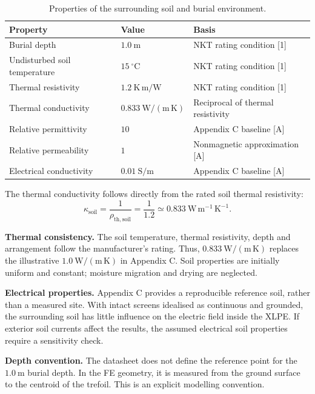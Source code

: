 \documentclass[11pt,a4paper]{article}
\newcommand{\subhead}[1]{\par\medskip{\large\bfseries #1}\par\smallskip}
\begin{document}
\begin{table}[H]
\centering
\caption{Properties of the surrounding soil and burial environment.}
\label{tab:soil}
\begin{tabularx}{\linewidth}{@{}Y l Y@{}}
\toprule
Property & Value & Basis\\
\midrule
Burial depth & \(1.0~\mathrm{m}\) & NKT rating condition [1]\\
Undisturbed soil temperature & \(15~^\circ\mathrm{C}\) & NKT rating condition [1]\\
Thermal resistivity & \(1.2~\mathrm{K\,m/W}\) & NKT rating condition [1]\\
Thermal conductivity & \(0.833~\mathrm{W/(m\,K)}\) & Reciprocal of thermal resistivity\\
Relative permittivity & \(10\) & Appendix C baseline [A]\\
Relative permeability & \(1\) & Nonmagnetic approximation [A]\\
Electrical conductivity & \(0.01~\mathrm{S/m}\) & Appendix C baseline [A]\\
\bottomrule
\end{tabularx}
\end{table}
The thermal conductivity follows directly from the rated soil thermal resistivity:
\[
 \kappa_{\mathrm{soil}}=\frac{1}{\rho_{\mathrm{th,soil}}}
 =\frac{1}{1.2}\simeq 0.833~\mathrm{W\,m^{-1}\,K^{-1}}.
\]

\subhead{Justification}
\textbf{Thermal consistency.}
The soil temperature, thermal resistivity, depth and arrangement follow the
manufacturer's rating. Thus, \(0.833~\mathrm{W/(m\,K)}\) replaces the illustrative
\(1.0~\mathrm{W/(m\,K)}\) in Appendix C. Soil properties are initially uniform
and constant; moisture migration and drying are neglected.

\textbf{Electrical properties.}
Appendix C provides a reproducible reference soil, rather than a measured site.
With intact screens idealised as continuous and grounded, the surrounding soil
has little influence on the electric field inside the XLPE.
If exterior soil currents affect the results, the assumed electrical soil
properties require a sensitivity check.

\textbf{Depth convention.}
The datasheet does not define the reference point for the \(1.0~\mathrm{m}\)
burial depth. In the FE geometry, it is measured from the ground surface to the
centroid of the trefoil. This is an explicit modelling convention.
\end{document}

